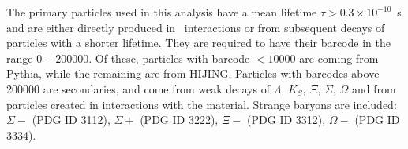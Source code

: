 The primary particles used in this analysis have a mean lifetime \mbox{$\tau > 0.3 \times 10^{-10}$~s} and are either directly produced in \pp\ interactions or from subsequent decays of particles with a shorter lifetime. They are required to have their barcode in the range $0 - 200000$. Of these, particles with barcode $< 10000$ are coming from Pythia, while the remaining are from HIJING. Particles with barcodes above 200000 are secondaries, and come from weak decays of $\Lambda$, $K_{S}$, $\Xi$, $\Sigma$, $\Omega$ and from particles created in interactions with the material. Strange baryons are included: $\Sigma-$ (PDG ID 3112), $\Sigma+$ (PDG ID 3222), $\Xi-$ (PDG ID 3312), $\Omega-$ (PDG ID 3334). 

\begin{figure}
\end{figure}
